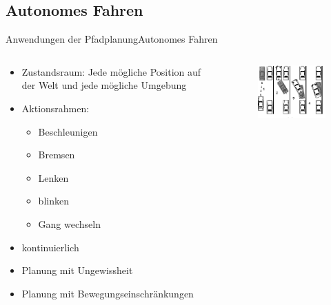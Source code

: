 \documentclass[t,aspectratio=169,dvipsnames]{beamer}
\begin{document}
\subsection{Autonomes Fahren}
\begin{frame}{Anwendungen der Pfadplanung}{Autonomes Fahren}
	\begin{columns}
		\begin{column}[T]{0.6\textwidth}
			\begin{itemize}
				\item Zustandsraum: Jede mögliche Position auf der Welt und jede mögliche Umgebung
				\item Aktionsrahmen:
				\begin{itemize}
					\item Beschleunigen
					\item Bremsen
					\item Lenken
					\item blinken
					\item Gang wechseln		
				\end{itemize}
				\item kontinuierlich
				\item Planung mit Ungewissheit
				\item Planung mit Bewegungseinschränkungen
			\end{itemize}
		\end{column}
		\begin{column}[T]{0.4\textwidth}
			\begin{figure}
				\includegraphics[width=6.0cm]{images/img239.png}
				\caption{} 
			\end{figure}
		\end{column}
	\end{columns}
\end{frame}

\begin{frame}[allowframebreaks]{\bibname}
\end{frame}
\end{document}
